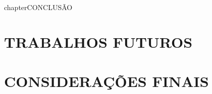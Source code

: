 chapter{CONCLUSÃO}
\label{chap:conclusao}

\section{TRABALHOS FUTUROS}
\label{sec:trabalhosFuturos}

\section{CONSIDERAÇÕES FINAIS}
\label{sec:consideracoesFinais}
